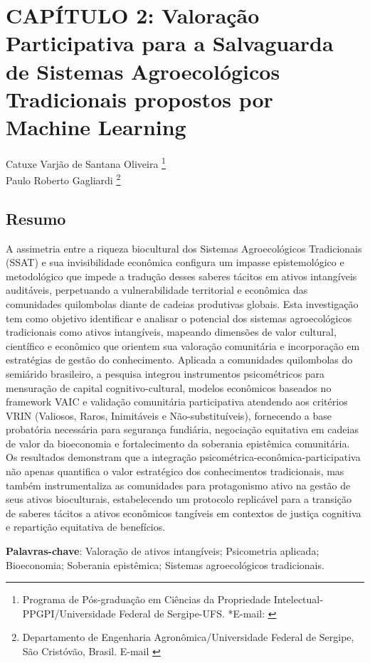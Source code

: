 \pagestyle{plain}

\chapter{CAPÍTULO 2: Valoração Participativa para a Salvaguarda de Sistemas Agroecológicos Tradicionais propostos por Machine Learning}


\begin{flushright}
Catuxe Varjão de Santana Oliveira  \footnote[1]{Programa de Pós-graduação em Ciências da Propriedade Intelectual-PPGPI/Universidade Federal de Sergipe-UFS. *E-mail:  \href{mailto:catuxe@academico.ufs.br}{}}
\\[0.5cm] 
Paulo Roberto Gagliardi \footnote[2]{Departamento de Engenharia Agronômica/Universidade Federal de Sergipe, São Cristóvão, Brasil. E-mail \href{mailto:ppgagri@yahoo.com.br}{}}
\end{flushright}


\begin{resumoumacoluna}
\section*{Resumo}
A assimetria entre a riqueza biocultural dos Sistemas Agroecológicos Tradicionais (SSAT) e sua invisibilidade econômica configura um impasse epistemológico e metodológico que impede a tradução desses saberes tácitos em ativos intangíveis auditáveis, perpetuando a vulnerabilidade territorial e econômica das comunidades quilombolas diante de cadeias produtivas globais. Esta investigação tem como objetivo identificar e analisar o potencial dos sistemas agroecológicos tradicionais como ativos intangíveis, mapeando dimensões de valor cultural, científico e econômico que orientem sua valoração comunitária e incorporação em estratégias de gestão do conhecimento. Aplicada a comunidades quilombolas do semiárido brasileiro, a pesquisa integrou instrumentos psicométricos para mensuração de capital cognitivo-cultural, modelos econômicos baseados no framework VAIC e validação comunitária participativa atendendo aos critérios VRIN (Valiosos, Raros, Inimitáveis e Não-substituíveis), fornecendo a base probatória necessária para segurança fundiária, negociação equitativa em cadeias de valor da bioeconomia e fortalecimento da soberania epistêmica comunitária. Os resultados demonstram que a integração psicométrica-econômica-participativa não apenas quantifica o valor estratégico dos conhecimentos tradicionais, mas também instrumentaliza as comunidades para protagonismo ativo na gestão de seus ativos bioculturais, estabelecendo um protocolo replicável para a transição de saberes tácitos a ativos econômicos tangíveis em contextos de justiça cognitiva e repartição equitativa de benefícios.

\vspace{\onelineskip}
\noindent
\textbf{Palavras-chave}: Valoração de ativos intangíveis; Psicometria aplicada; Bioeconomia; Soberania epistêmica; Sistemas agroecológicos tradicionais.
\end{resumoumacoluna}

